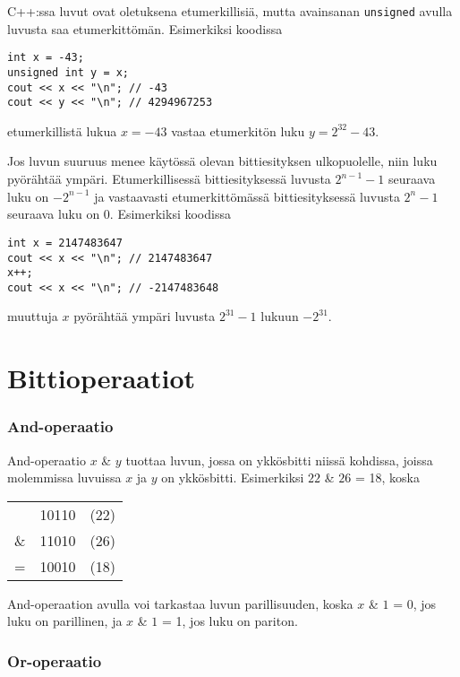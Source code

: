 C++:ssa luvut ovat oletuksena etumerkillisiä,
mutta avainsanan \texttt{unsigned} avulla
luvusta saa etumerkittömän.
Esimerkiksi koodissa

\begin{lstlisting}
int x = -43;
unsigned int y = x;
cout << x << "\n"; // -43
cout << y << "\n"; // 4294967253
\end{lstlisting}

etumerkillistä lukua $x=-43$ vastaa etumerkitön luku $y=2^{32}-43$.

Jos luvun suuruus menee käytössä
olevan bittiesityksen ulkopuolelle,
niin luku pyörähtää ympäri.
Etumerkillisessä bittiesityksessä
luvusta $2^{n-1}-1$ seuraava luku on $-2^{n-1}$
ja vastaavasti etumerkittömässä bittiesityksessä
luvusta $2^n-1$ seuraava luku on $0$.
Esimerkiksi koodissa

\begin{lstlisting}
int x = 2147483647
cout << x << "\n"; // 2147483647
x++;
cout << x << "\n"; // -2147483648
\end{lstlisting}

muuttuja $x$ pyörähtää ympäri luvusta $2^{31}-1$ lukuun $-2^{31}$.

\section{Bittioperaatiot}

\newcommand\XOR{\mathbin{\char`\^}}

\subsubsection{And-operaatio}

And-operaatio $x$ \& $y$ tuottaa luvun,
jossa on ykkösbitti niissä kohdissa,
joissa molemmissa luvuissa $x$ ja $y$ on ykkösbitti.
Esimerkiksi $22$ \& $26$ = 18, koska

\begin{center}
\begin{tabular}{rrr}
& 10110 & (22)\\
\& & 11010 & (26) \\
\hline
 = & 10010 & (18) \\
\end{tabular}
\end{center}

And-operaation avulla voi tarkastaa luvun parillisuuden,
koska $x$ \& $1$ = 0, jos luku on parillinen,
ja $x$ \& $1$ = 1, jos luku on pariton.

\subsubsection{Or-operaatio}

